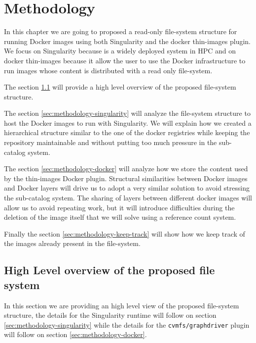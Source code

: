 \chapter{Methodology}\label{ch:Methodology}

In this chapter we are going to proposed a read-only file-system structure for
running Docker images using both Singularity and the docker thin-images plugin.
We focus on Singularity because is a widely deployed system in HPC and on
docker thin-images because it allow the user to use the Docker infrastructure
to run images whose content is distributed with a read only file-system.

The section \ref{sec:methodology-high-level} will provide a high level overview
of the proposed file-system structure.

The section \ref{sec:methodology-singularity} will analyze the file-system
structure to host the Docker images to run with Singularity. We will explain
how we created a hierarchical structure similar to the one of the docker
registries while keeping the repository maintainable and without putting too
much pressure in the sub-catalog system.

The section \ref{sec:methodology-docker} will analyze how we store the content used
by the thin-images Docker plugin. Structural similarities between Docker images
and Docker layers will drive us to adopt a very similar solution to avoid
stressing the sub-catalog system. The sharing of layers between different
docker images will allow us to avoid repeating work, but it will introduce
difficulties during the deletion of the image itself that we will solve using a
reference count system.

Finally the section \ref{sec:methodology-keep-track} will show how we keep
track of the images already present in the file-system.

\section{High Level overview of the proposed file system}
\label{sec:methodology-high-level}

In this section we are providing an high level view of the proposed file-system
structure, the details for the Singularity runtime will follow on section
\ref{sec:methodology-singularity} while the details for the
\texttt{cvmfs/graphdriver} plugin will follow on section
\ref{sec:methodology-docker}.

